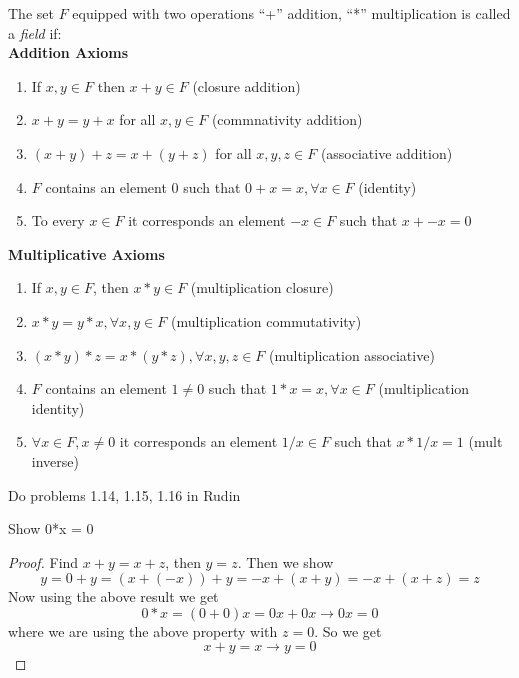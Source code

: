 \begin{definition}[Fields]
	The set \( F \) equipped with two operations ``+'' addition, ``*'' multiplication is called
	a {\em field} if: \\
	\textbf{Addition Axioms}
	\begin{enumerate}[1)]
		\item If \( x,y \in F \) then \( x+y \in F \) (closure addition)
		\item \( x+y = y+x \) for all \( x,y \in F \) (commnativity addition)
		\item \( (x+y) + z = x + (y+z) \) for all \( x,y,z \in F \) (associative addition)
		\item \( F \) contains an element \( 0 \) such that \( 0 + x = x, \forall x \in F \) 
			(identity)
		\item To every \( x \in F \) it corresponds an element \( -x \in F \) such that 
			\( x + -x = 0 \)
	\end{enumerate}
	\textbf{Multiplicative Axioms}
	\begin{enumerate}[1)]
		\item If \( x,y \in F \), then \( x*y \in F \) (multiplication closure)
		\item \( x *y = y*x, \forall x,y \in F \) (multiplication commutativity)
		\item \( (x*y)*z = x*(y*z), \forall x,y,z \in F \) (multiplication associative)
		\item \( F \) contains an element \( 1 \not = 0 \) such that 
			\( 1 * x = x, \forall x \in F \) (multiplication identity)
		\item \( \forall x \in F, x \not = 0 \) it corresponds an element 
			\( 1/x \in F \) such that \( x * 1/x = 1 \) (mult inverse)
	\end{enumerate} 
	\label{def:Fields}
\end{definition}

\begin{exercise}
	Do problems 1.14, 1.15, 1.16 in Rudin
\end{exercise}
\begin{exercise}
	Show 0*x = 0
\end{exercise}
\begin{proof}
	Find \( x + y = x + z \), then \( y = z \). Then we show
	\[
		y = 0 + y = (x + (-x)) + y = -x + (x + y) = -x + (x + z) = z
	\]
	Now using the above result we get
	\[
	0 * x = (0 + 0)x = 0x + 0x \rightarrow 0x = 0 
	\]
	where we are using the above property with \( z = 0 \). So we get
	\[
		 x+y = x \rightarrow y = 0
	\]
\end{proof}

